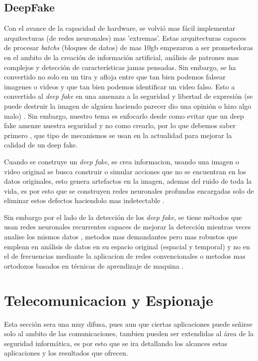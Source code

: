 \documentclass[a4paper]{IEEEtranUNT}
\begin{document}
\subsection{DeepFake}

Con el avance de la capacidad de hardware, se volvió mas fácil implementar arquitecturas (de redes neuronales) mas 'extremas'. Estas arquitecturas capaces de procesar \textit{batchs} (bloques de datos) de mas 10gb empezaron a ser prometedoras en el ambito de la creación de información artificial, análisis de patrones mas complejos y detección de características jamas pensadas. Sin embargo, se ha convertido no solo en un tira y afloja entre que tan bien podemos falsear imagenes o videos y que tan bien podemos identificar un video falso.
Esto a convertido al \textit{deep fake} en una amenaza a la seguridad y libertad de expresión (se puede destruir la imagen de alguien haciendo parecer dio una opinión o hizo algo malo) \citep{Lyu2020}. Sin embargo, nuestro tema es enfocarlo desde como evitar que un deep fake amenze nuestra seguridad y no como crearlo, por lo que debemos saber primero , que tipo de mecanismos se usan en la actualidad para mejorar la calidad de un deep fake.

Cuando se construye un \textit{deep fake}, se crea informacion, usando una imagen o video original se busca construir o simular acciones que no se encuentran en los datos originales, esto genera artefactos en la imagen, ademas del ruido de toda la vida, es por esto que se construyen redes neuronales profundas encargadas solo de eliminar estos defectos haciendolo mas indetectable \citep{huang2020fakepolisher}.

Sin embargo por el lado de la detección de los \textit{deep fake}, se tiene métodos que usan redes neuronales recurrentes capaces de mejorar la detección mientras veces analise los mismos datos \citep{8639163}, metodos mas demandantes pero mas robustos que emplean en análisis de datos en su espacio original (espacial y temporal) y no en el de frecuencias mediante la aplicacion de redes convencionales \citep{lima2020deepfake} o metodos mas ortodoxos basados en técnicas de aprendizaje de maquina \citep{Maksutov2020}.

\section{Telecomunicacion y Espionaje}

Esta sección sera una muy difusa, pues aun que ciertas aplicaciones puede señirse solo al ambito de las comunicaciones, tambien pueden ser extendidas al área de la seguridad informática, es por esto que se ira detallando los alcances estas aplicaciones y los resultados que ofrecen.
\end{document}
